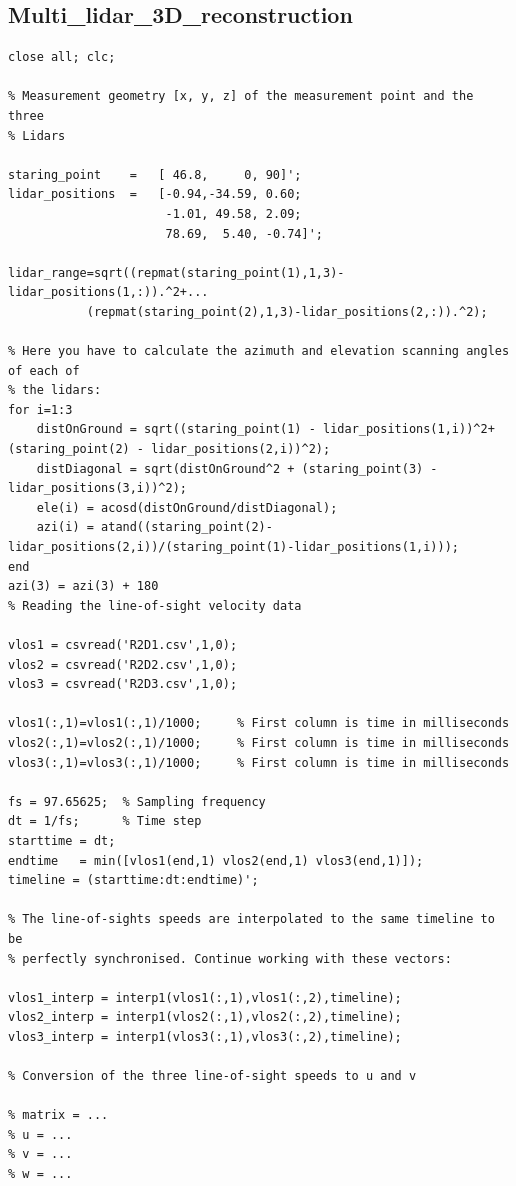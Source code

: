 \documentclass[10pt]{article}
\begin{document}
\subsection{Multi\_lidar\_3D\_reconstruction}
\begin{lstlisting}
close all; clc;
      
% Measurement geometry [x, y, z] of the measurement point and the three
% Lidars

staring_point    =   [ 46.8,     0, 90]';
lidar_positions  =   [-0.94,-34.59, 0.60;
                      -1.01, 49.58, 2.09;
                      78.69,  5.40, -0.74]';
         
lidar_range=sqrt((repmat(staring_point(1),1,3)-lidar_positions(1,:)).^2+...
           (repmat(staring_point(2),1,3)-lidar_positions(2,:)).^2);
       
% Here you have to calculate the azimuth and elevation scanning angles of each of
% the lidars:
for i=1:3
    distOnGround = sqrt((staring_point(1) - lidar_positions(1,i))^2+(staring_point(2) - lidar_positions(2,i))^2);
    distDiagonal = sqrt(distOnGround^2 + (staring_point(3) - lidar_positions(3,i))^2);
    ele(i) = acosd(distOnGround/distDiagonal);
    azi(i) = atand((staring_point(2)-lidar_positions(2,i))/(staring_point(1)-lidar_positions(1,i)));
end
azi(3) = azi(3) + 180
% Reading the line-of-sight velocity data

vlos1 = csvread('R2D1.csv',1,0);
vlos2 = csvread('R2D2.csv',1,0);
vlos3 = csvread('R2D3.csv',1,0);

vlos1(:,1)=vlos1(:,1)/1000;     % First column is time in milliseconds
vlos2(:,1)=vlos2(:,1)/1000;     % First column is time in milliseconds
vlos3(:,1)=vlos3(:,1)/1000;     % First column is time in milliseconds

fs = 97.65625;  % Sampling frequency
dt = 1/fs;      % Time step
starttime = dt;
endtime   = min([vlos1(end,1) vlos2(end,1) vlos3(end,1)]);
timeline = (starttime:dt:endtime)';

% The line-of-sights speeds are interpolated to the same timeline to be
% perfectly synchronised. Continue working with these vectors:

vlos1_interp = interp1(vlos1(:,1),vlos1(:,2),timeline);
vlos2_interp = interp1(vlos2(:,1),vlos2(:,2),timeline);
vlos3_interp = interp1(vlos3(:,1),vlos3(:,2),timeline);

% Conversion of the three line-of-sight speeds to u and v

% matrix = ...
% u = ...
% v = ...
% w = ...


\end{lstlisting}
\end{document}
